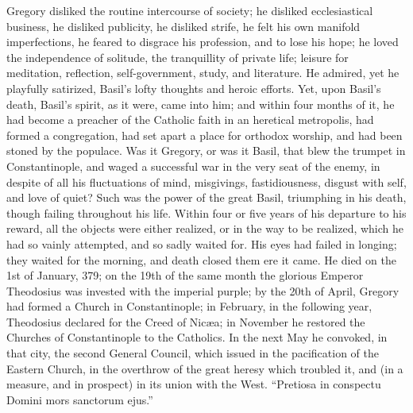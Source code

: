 Gregory disliked the routine intercourse of society; he disliked
ecclesiastical business, he disliked publicity, he disliked strife, he
felt his own manifold imperfections, he feared to disgrace his
profession, and to lose his hope; he loved the independence of
solitude, the tranquillity of private life; leisure for meditation,
reflection, self-government, study, and literature. He admired, yet he
playfully satirized, Basil's lofty thoughts and heroic efforts. Yet,
upon Basil's death, Basil's spirit, as it were, came into him; and
within four months of it, he had become a preacher of the Catholic
faith in an heretical metropolis, had formed a congregation, had set
apart a place for orthodox worship, and had been stoned by the
populace. Was it Gregory, or was it Basil, that blew the trumpet in
Constantinople, and waged a successful war in the very seat of the
enemy, in despite of all his fluctuations of mind, misgivings,
fastidiousness, disgust with self, and love of quiet? Such was the
power of the great Basil, triumphing in his death, though failing
throughout his life. Within four or five years of his departure to his
reward, all the objects were either realized, or in the way to be
realized, which he had so vainly attempted, and so sadly waited for.
His eyes had failed in longing; they waited for the morning, and death
closed them ere it came. He died on the 1st of January, 379; on the
19th of the same month the glorious Emperor Theodosius was invested
with the imperial purple; by the 20th of April, Gregory had formed a
Church in Constantinople; in February, in the following year,
Theodosius declared for the Creed of Nicæa; in November he
restored the Churches of Constantinople to the Catholics. In the next
May he convoked, in that city, the second General Council, which
issued in the pacification of the Eastern Church, in the overthrow of
the great heresy which troubled it, and (in a measure, and in
prospect) in its union with the West. ``Pretiosa in conspectu
Domini mors sanctorum ejus.''

